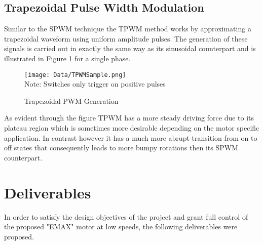 \documentclass[12pt]{article}
\begin{document}
\subsection{Trapezoidal Pulse Width Modulation}%

Similar to the SPWM technique the TPWM method works by approximating a trapezoidal waveform using uniform amplitude pulses. The generation of these signals is carried out in exactly the same way as its sinusoidal counterpart and is illustrated in Figure \ref{TPWMSample} for a single phase.

\begin{figure}[H]
\centering
\caption{Trapezoidal PWM Generation\cite{Patel_useof}}
\texttt{[image: Data/TPWMSample.png]}
\\Note: Switches only trigger on positive pulses
\label{TPWMSample}
\end{figure}

As evident through the figure TPWM has a more steady driving force due to its plateau region which is sometimes more desirable depending on the motor specific application. In contrast however it has a much more abrupt transition from on to off states that consequently leads to more bumpy rotations then its SPWM counterpart. 




\section{Deliverables}%

In order to satisfy the design objectives of the project and grant full control of the proposed "EMAX" motor at low speeds, the following deliverables were proposed.
\end{document}
